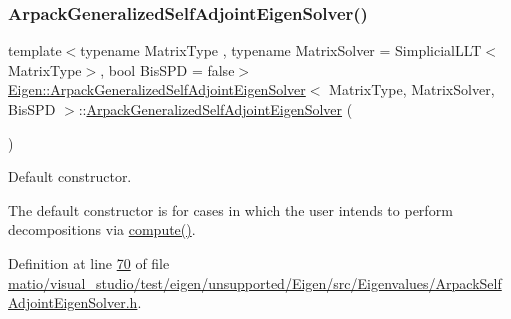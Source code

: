 \subsubsection{\texorpdfstring{Arpack\+Generalized\+Self\+Adjoint\+Eigen\+Solver()}{ArpackGeneralizedSelfAdjointEigenSolver()}\hspace{0.1cm}{\footnotesize\ttfamily [4/6]}}
{\footnotesize\ttfamily template$<$typename Matrix\+Type , typename Matrix\+Solver  = Simplicial\+L\+L\+T$<$\+Matrix\+Type$>$, bool Bis\+S\+PD = false$>$ \\
\hyperlink{class_eigen_1_1_arpack_generalized_self_adjoint_eigen_solver}{Eigen\+::\+Arpack\+Generalized\+Self\+Adjoint\+Eigen\+Solver}$<$ Matrix\+Type, Matrix\+Solver, Bis\+S\+PD $>$\+::\hyperlink{class_eigen_1_1_arpack_generalized_self_adjoint_eigen_solver}{Arpack\+Generalized\+Self\+Adjoint\+Eigen\+Solver} (\begin{DoxyParamCaption}{ }\end{DoxyParamCaption})\hspace{0.3cm}{\ttfamily [inline]}}



Default constructor. 

The default constructor is for cases in which the user intends to perform decompositions via \hyperlink{class_eigen_1_1_arpack_generalized_self_adjoint_eigen_solver_a1a905e5e65e82e559a2cc394a9f42385}{compute()}. 

Definition at line \hyperlink{matio_2visual__studio_2test_2eigen_2unsupported_2_eigen_2src_2_eigenvalues_2_arpack_self_adjoint_eigen_solver_8h_source_l00070}{70} of file \hyperlink{matio_2visual__studio_2test_2eigen_2unsupported_2_eigen_2src_2_eigenvalues_2_arpack_self_adjoint_eigen_solver_8h_source}{matio/visual\+\_\+studio/test/eigen/unsupported/\+Eigen/src/\+Eigenvalues/\+Arpack\+Self\+Adjoint\+Eigen\+Solver.\+h}.

\mbox{\label{class_eigen_1_1_arpack_generalized_self_adjoint_eigen_solver_ab67d6c5218fd84e74fc03d55acd0c89e}} 
